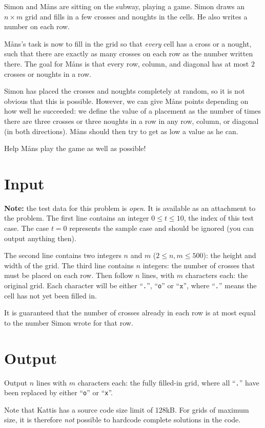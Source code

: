 Simon and Måns are sitting on the subway, playing a game.
Simon draws an $n \times m$ grid and fills in a few crosses and noughts in the cells.
He also writes a number on each row.

Måns's task is now to fill in the grid so that \emph{every} cell has a cross or a nought, such that
there are exactly as many crosses on each row as the number written there.
The goal for Måns is that every row, column, and diagonal has at most $2$ crosses or noughts in a row.

Simon has placed the crosses and noughts completely at random, so it is not obvious that this is possible.
However, we can give Måns points depending on how well he succeeded: we define the value of a placement
as the number of times there are three crosses or three noughts in a row in any row, column, or diagonal
(in both directions).
Måns should then try to get as low a value as he can.

Help Måns play the game as well as possible!

\section*{Input}
\textbf{Note:} the test data for this problem is \emph{open}. It is available as an attachment to the problem.
The first line contains an integer $0 \le t \le 10$, the index of this test case.
The case $t = 0$ represents the sample case and should be ignored (you can output anything then).

The second line contains two integers $n$ and $m$ ($2 \le n, m \le 500$): the height and width of the grid.
The third line contains $n$ integers: the number of crosses that must be placed on each row.
Then follow $n$ lines, with $m$ characters each: the original grid.
Each character will be either ``\texttt{.}'', ``\texttt{o}'' or ``$\texttt{x}$'',
where ``\texttt{.}'' means the cell has not yet been filled in.

It is guaranteed that the number of crosses already in each row is at most equal to the number Simon wrote for that row.

\section*{Output}
Output $n$ lines with $m$ characters each: the fully filled-in grid, where all ``\texttt{.}'' have been replaced
by either ``\texttt{o}'' or ``\texttt{x}''.

Note that Kattis has a source code size limit of 128kB. For grids of maximum size, it is therefore
\emph{not} possible to hardcode complete solutions in the code.

